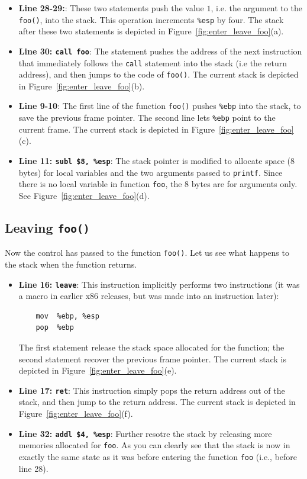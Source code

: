 \begin{itemize}
\item \textbf{Line 28-29:}:
These two statements push the value $1$, i.e. the argument to the {\tt foo()}, 
into the stack. This operation increments {\tt \%esp} by four. The stack
after these two statements is depicted in Figure~\ref{fig:enter_leave_foo}(a).

\item \textbf{Line 30: \texttt{call foo}}: 
The statement pushes the address of the next instruction that 
immediately follows the {\tt call} statement into the 
stack (i.e the return address), and then jumps to the 
code of {\tt foo()}. 
The current stack is depicted in Figure~\ref{fig:enter_leave_foo}(b).

\item \textbf{Line 9-10}:
The first line of the function {\tt foo()} pushes {\tt \%ebp} into
the stack, to save the previous frame pointer. The second
line lets {\tt \%ebp} point to the current frame. The current stack 
is depicted in Figure~\ref{fig:enter_leave_foo}(c). 

\item \textbf{Line 11: \texttt{subl \$8, \%esp}}:
The stack pointer is modified to allocate space (8 bytes) for 
local variables and the two arguments passed to {\tt printf}. 
Since there is no local variable in function {\tt foo}, the
8 bytes are for arguments only. 
See Figure~\ref{fig:enter_leave_foo}(d). 

\end{itemize}


\subsection{Leaving {\tt foo()}}

Now the control has passed to the function {\tt foo()}. Let us see what happens
to the stack when the function returns.

\begin{itemize}
\item \textbf{Line 16: \texttt{leave}}: This
instruction implicitly performs two instructions (it was a macro
in earlier x86 releases, but was made into an instruction later):
\begin{verbatim}
    mov  %ebp, %esp
    pop  %ebp
\end{verbatim}
The first statement release the stack space allocated for the function; 
the second statement recover the previous frame pointer. 
The current stack is depicted in Figure~\ref{fig:enter_leave_foo}(e). 

\item \textbf{Line 17: \texttt{ret}}: This instruction simply pops the return 
address out of the stack, and then jump to the return address.
The current stack is depicted in Figure~\ref{fig:enter_leave_foo}(f).

\item \textbf{Line 32: \texttt{addl \$4, \%esp}}: Further resotre the stack by
releasing more memories allocated for {\tt foo}. 
As you can clearly see that the stack is now in exactly the same state as it was
before entering the function {\tt foo} (i.e., before line 28). 
\end{itemize}


